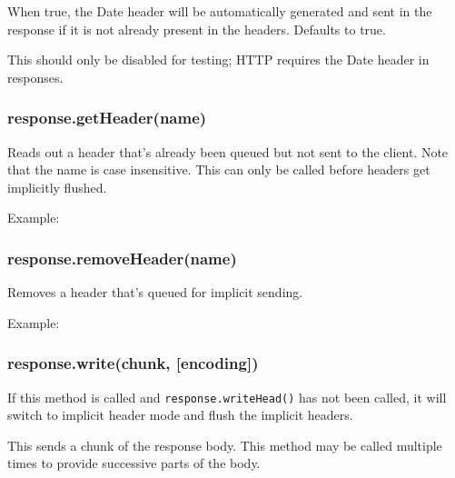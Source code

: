 When true, the Date header will be automatically generated and sent in
the response if it is not already present in the headers. Defaults to
true.

This should only be disabled for testing; HTTP requires the Date header
in responses.

\subsubsection{response.getHeader(name)}

Reads out a header that's already been queued but not sent to the
client. Note that the name is case insensitive. This can only be called
before headers get implicitly flushed.

Example:

\begin{Shaded}
\begin{Highlighting}[]
 \NormalTok{(}\NormalTok{);}
\end{Highlighting}
\end{Shaded}

\subsubsection{response.removeHeader(name)}

Removes a header that's queued for implicit sending.

Example:

\begin{Shaded}
\begin{Highlighting}[]
\NormalTok{(}\NormalTok{);}
\end{Highlighting}
\end{Shaded}

\subsubsection{response.write(chunk, {[}encoding{]})}

If this method is called and \texttt{response.writeHead()} has not been
called, it will switch to implicit header mode and flush the implicit
headers.

This sends a chunk of the response body. This method may be called
multiple times to provide successive parts of the body.

